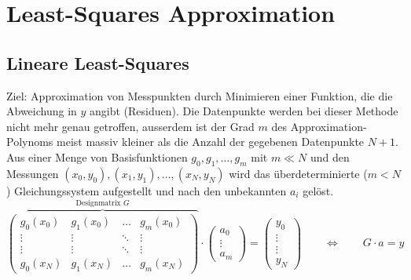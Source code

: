 \section{Least-Squares Approximation}
\subsection{Lineare Least-Squares}
Ziel: Approximation von Messpunkten durch Minimieren einer Funktion, die die Abweichung in $y$
angibt (Residuen). Die Datenpunkte werden bei dieser Methode nicht mehr genau getroffen, ausserdem ist der Grad $m$ des Approximation-Polynoms meist massiv kleiner als die Anzahl der gegebenen Datenpunkte $N+1$.\\

Aus einer Menge von Basisfunktionen ${g_0,g_1,\ldots,g_m}$ mit $m \ll N$ und den Messungen $(x_0,y_0),(x_1,y_1),\ldots,(x_N,y_N)$ wird das überdeterminierte ($m<N$) Gleichungssystem aufgestellt und nach den unbekannten $a_i$ gelöst.
\[
    \overbrace{
    \begin{pmatrix}
        g_0(x_0) & g_1(x_0) & \ldots & g_m(x_0) \\
        \vdots & \vdots & \ddots & \vdots \\
        \vdots & \vdots & \ddots & \vdots \\
        g_0(x_N) & g_1(x_N) & \ldots & g_m(x_N)
    \end{pmatrix}}^{\text{Designmatrix } G}
    \cdot
    \begin{pmatrix}
        a_0 \\ \vdots \\ a_m
    \end{pmatrix}
    =
    \begin{pmatrix}
        y_0 \\ \vdots \\ \vdots \\ y_N
    \end{pmatrix}
    \qquad
    \Leftrightarrow
    \qquad
    G \cdot a = y
\]


